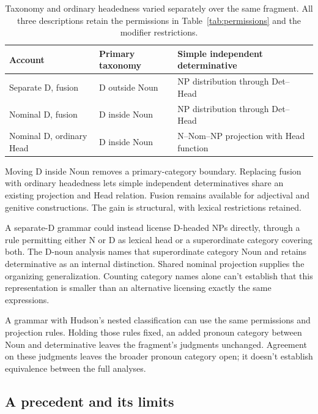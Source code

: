 \documentclass[12pt]{article}
\begin{document}
\begin{table}[tb]
\centering\small
\caption{Taxonomy and ordinary headedness varied separately over the same fragment. All three descriptions retain the permissions in Table~\ref{tab:permissions} and the modifier restrictions.}\label{tab:economy}
\begin{tabular}{>{\raggedright\arraybackslash}p{3.1cm}>{\raggedright\arraybackslash}p{3.9cm}>{\raggedright\arraybackslash}p{4.7cm}}
\toprule
Account & Primary taxonomy & Simple independent determinative \\
\midrule
Separate D, fusion & D outside Noun & NP distribution through Det--Head \\
Nominal D, fusion & D inside Noun & NP distribution through Det--Head \\
Nominal D, ordinary Head & D inside Noun & N--Nom--NP projection with Head function \\
\bottomrule
\end{tabular}
\end{table}

Moving D inside Noun removes a primary-category boundary. Replacing fusion with ordinary headedness lets simple independent determinatives share an existing projection and Head relation. Fusion remains available for adjectival and genitive constructions. The gain is structural, with lexical restrictions retained.

A separate-D grammar could instead license D-headed NPs directly, through a rule permitting either N or D as lexical head or a superordinate category covering both. The D-noun analysis names that superordinate category Noun and retains determinative as an internal distinction. Shared nominal projection supplies the organizing generalization. Counting category names alone can't establish that this representation is smaller than an alternative licensing exactly the same expressions.

A grammar with Hudson's nested classification can use the same permissions and projection rules. Holding those rules fixed, an added pronoun category between Noun and determinative leaves the fragment's judgments unchanged. Agreement on these judgments leaves the broader pronoun category open; it doesn't establish equivalence between the full analyses.

\subsection{A precedent and its limits}
\end{document}
